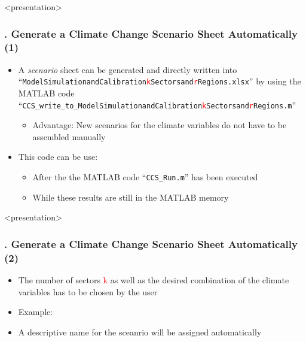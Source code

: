 \documentclass[11pt,aspectratio=169]{beamer}
\begin{document}
\begin{frame}<presentation>
	\frametitle{{\thesection.\thesubsection} Generate a Climate Change Scenario Sheet Automatically (1)}
	\begin{itemize}
		\item A \textit{scenario} sheet can be generated and directly written into  ``\texttt{ModelSimulationandCalibration\textcolor{red}{k}Sectorsand\textcolor{red}{r}Regions.xlsx}'' by using the MATLAB code 	\footnotesize ``\texttt{CCS\_write\_to\_ModelSimulationandCalibration\textcolor{red}{k}Sectorsand\textcolor{red}{r}Regions.m}''
		\begin{itemize}
			\item Advantage: New scenarios for the climate variables do not have to be assembled manually
		\end{itemize}
		\item This code can be use:
		\begin{itemize}
			\item After the the MATLAB code ``\texttt{CCS\_Run.m}'' has been executed 
			\item While these results are still in the MATLAB memory
		\end{itemize}
	\end{itemize}
\end{frame}
\begin{frame}<presentation>
	\frametitle{{\thesection.\thesubsection} Generate a Climate Change Scenario Sheet Automatically (2)}
	\begin{itemize}
		\item The number of sectors \textcolor{red}{k} as well as the desired combination of the climate variables has to be chosen by the user
		\item Example:
		\begin{figure}
		\end{figure}
		\item A descriptive name for the sceanrio will be assigned automatically 
	\end{itemize}
\end{frame}

\end{document}
